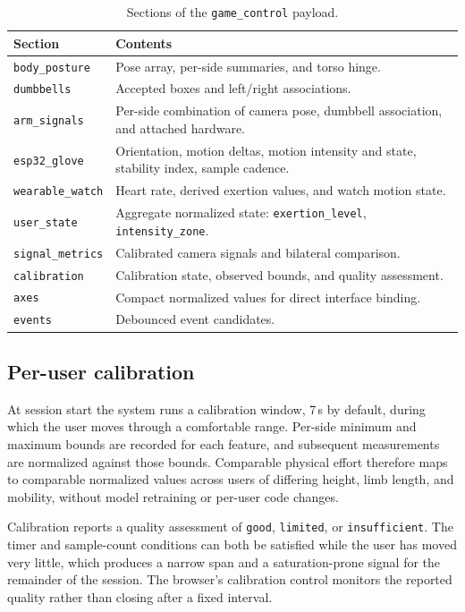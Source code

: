 \documentclass[11pt,a4paper]{article}
\newcommand{\code}[1]{\texttt{\small #1}}
\begin{document}
\begin{table}[H]
\centering
\small
\caption{Sections of the \code{game\_control} payload.}
\begin{tabularx}{\textwidth}{@{}L{3.4cm} Y@{}}
\toprule
\textbf{Section} & \textbf{Contents} \\
\midrule
\code{body\_posture} & Pose array, per-side summaries, and torso hinge. \\
\code{dumbbells} & Accepted boxes and left/right associations. \\
\code{arm\_signals} & Per-side combination of camera pose, dumbbell association, and attached hardware. \\
\code{esp32\_glove} & Orientation, motion deltas, motion intensity and state, stability index, sample cadence. \\
\code{wearable\_watch} & Heart rate, derived exertion values, and watch motion state. \\
\code{user\_state} & Aggregate normalized state: \code{exertion\_level}, \code{intensity\_zone}. \\
\code{signal\_metrics} & Calibrated camera signals and bilateral comparison. \\
\code{calibration} & Calibration state, observed bounds, and quality assessment. \\
\code{axes} & Compact normalized values for direct interface binding. \\
\code{events} & Debounced event candidates. \\
\bottomrule
\end{tabularx}
\end{table}

\subsection{Per-user calibration}
\label{sec:calibration}

At session start the system runs a calibration window, 7\,s by default, during
which the user moves through a comfortable range. Per-side minimum and maximum
bounds are recorded for each feature, and subsequent measurements are normalized
against those bounds. Comparable physical effort therefore maps to comparable
normalized values across users of differing height, limb length, and mobility,
without model retraining or per-user code changes.

Calibration reports a quality assessment of \code{good}, \code{limited}, or
\code{insufficient}. The timer and sample-count conditions can both be satisfied
while the user has moved very little, which produces a narrow span and a
saturation-prone signal for the remainder of the session. The browser's
calibration control monitors the reported quality rather than closing after a
fixed interval.
\end{document}
